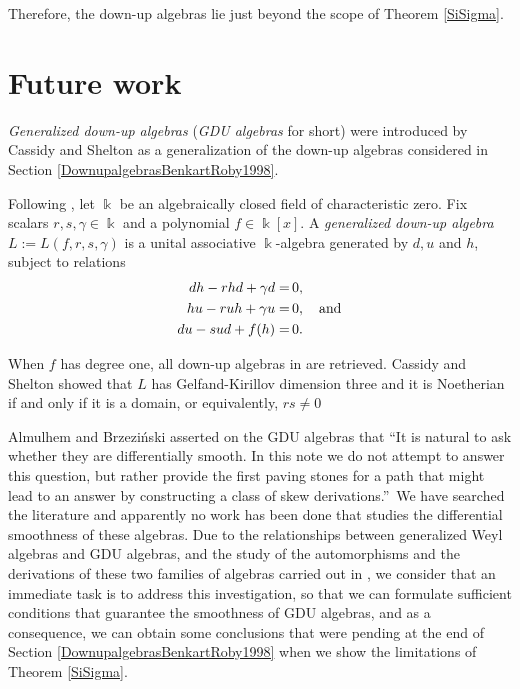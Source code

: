 \documentclass{amsart}
\theoremstyle{definition}
\theoremstyle{remark}
\numberwithin{equation}{section}
\begin{document}
Therefore, the down-up algebras lie just beyond the scope of Theorem \ref{SiSigma}.


\section{Future work}\label{Futurework}

{\em Generalized down-up algebras} ({\em GDU algebras} for short) were introduced by Cassidy and Shelton \cite{CassidyShelton2004} as a generalization of the down-up algebras considered in Section \ref{DownupalgebrasBenkartRoby1998}.

Following \cite[Section 2]{CassidyShelton2004}, let $\Bbbk$ be an algebraically closed field of characteristic zero. Fix scalars $r,s, \gamma \in \Bbbk$ and a polynomial $f\in \Bbbk[x]$. A {\em generalized down-up algebra} $L := L(f, r, s, \gamma)$ is a unital associative $\Bbbk$-algebra generated by $d, u$ and $h$, subject to relations
\begin{align}
    dh - rhd + \gamma d = &\, 0, \\
    hu - ruh + \gamma u = &\, 0, \quad {\rm and} \\
    du - sud + f(h) = &\, 0.
\end{align}   

When $f$ has degree one, all down-up algebras in \cite{Benkart1998, BenkartRoby1998} are retrieved. Cassidy and Shelton \cite{CassidyShelton2004} showed that $L$ has Gelfand-Kirillov dimension three and it is Noetherian if and only if it is a domain, or equivalently, $rs \neq 0$

Almulhem and Brzezi\'nski \cite[Section 1]{AlmulhemBrzezinski2019} asserted on the GDU algebras that \textquotedblleft It is natural to ask whether they are differentially smooth. In this note we do not attempt to answer this question, but rather provide the first paving stones for a path that might lead to an answer by constructing a class of skew derivations.\textquotedblright \ We have searched the literature and apparently no work has been done that studies the differential smoothness of these algebras. Due to the relationships between generalized Weyl algebras and GDU algebras, and the study of the automorphisms and the derivations of these two families of algebras carried out in \cite{Brzezinski2016, CarvalhoLopes2009, CassidyShelton2004, Kirkmanetal1999}, we consider that an immediate task is to address this investigation, so that we can formulate sufficient conditions that guarantee the smoothness of GDU algebras, and as a consequence, we can obtain some conclusions that were pending at the end of Section \ref{DownupalgebrasBenkartRoby1998} when we show the limitations of Theorem \ref{SiSigma}.
\end{document}
